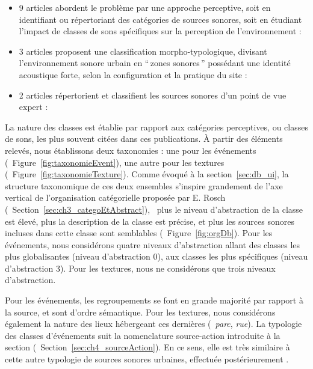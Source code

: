 \begin{itemize}
\item 9 articles abordent le problème par une approche perceptive, soit en identifiant ou répertoriant des catégories de sources sonores, soit en étudiant l'impact de classes de sons spécifiques sur la perception de l'environnement : \cite{maffiolo_caracterisation_1999,raimbault2002simulation,guastavino_etude_2003,defreville2004aactivity,raimbault2005urban,dubois2006cognitive,devergie_relations_2006,guastavino2006ideal,niessen2010categories}
\item 3 articles proposent une classification morpho-typologique, divisant l’environnement sonore urbain en ``\,zones sonores\,'' possédant une identité acoustique forte, selon la configuration et la pratique du site : \cite{maffiolo_caracterisation_1999,beaumont2004pertinence,polack2008perceptive}
\item 2 articles répertorient et classifient les sources sonores d’un point de vue expert : \cite{leobon_analyse_1986,brown2011towards}
\end{itemize}

La nature des classes est établie par rapport aux catégories perceptives, ou classes de sons, les plus souvent citées dans ces publications. À partir des éléments relevés, nous établissons deux taxonomies : une pour les événements (\cf~Figure~\ref{fig:taxonomieEvent}), une autre pour les textures (\cf~Figure~\ref{fig:taxonomieTexture}). Comme évoqué à la section~\ref{sec:db_ui}, la structure taxonomique de ces deux ensembles s'inspire grandement de l'axe vertical de l'organisation catégorielle proposée par E. Rosch (\cf~Section~\ref{sec:ch3_categoEtAbstract}), \ie~plus le niveau d'abstraction de la classe est élevé, plus la description de la classe est précise, et plus les sources sonores incluses dans cette classe sont semblables (\cf~Figure~\ref{fig:orgDb}). Pour les événements, nous considérons quatre niveaux d'abstraction allant des classes les plus globalisantes (niveau d'abstraction 0), aux classes les plus spécifiques (niveau d'abstraction 3). Pour les textures, nous ne considérons que trois niveaux d'abstraction.

Pour les événements, les regroupements se font en grande majorité par rapport à la source, et sont d’ordre sémantique. Pour les textures, nous considérons également la nature des lieux hébergeant ces dernières (\eg~\emph{parc}, \emph{rue}). La typologie des classes d'événements suit la nomenclature source-action introduite à la section (\cf~Section~\ref{sec:ch4_sourceAction}). En ce sens, elle est très similaire à cette autre typologie de sources sonores urbaines, effectuée postérieurement \citep{Salamon14}.

